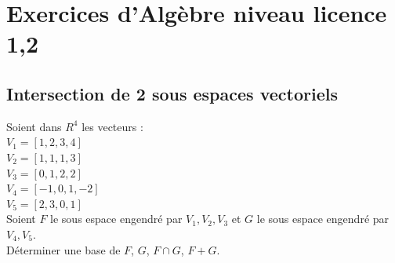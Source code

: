 \documentclass[a4paper,11pt]{book}
\begin{document}
\chapter{Exercices d'Alg\`ebre niveau licence 1,2}
\section{Intersection de 2 sous espaces vectoriels}
Soient dans $R^4$ les vecteurs :\\
$V_1=[1,2,3,4]$\\
$V_2=[1,1,1,3]$\\
$V_3=[0,1,2,2]$\\
$V_4=[-1,0,1,-2]$\\
$V_5=[2,3,0,1]$\\
Soient $F$ le sous espace engendr\'e par $V_1,V_2,V_3$ et
$G$ le sous espace engendr\'e par $V_4,V_5$.\\
D\'eterminer une base de $F$, $G$, $F \cap G$, $F+G$.
\end{document}
